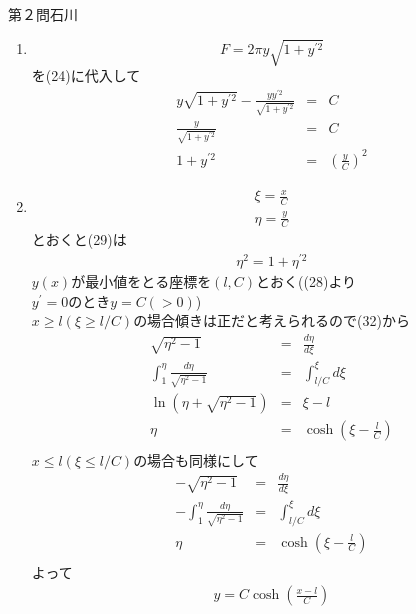 \begin{answer}{第２問}{石川}
\begin{enumerate}
\begin{eqnarray}
  \int_{x_0}^{x_1} 2\pi y\sqrt{1+y^{\prime 2}}dx
  \end{eqnarray}
\item 
  \begin{equation}
  F = 2\pi y\sqrt{1+y^{\prime 2}}
  \end{equation}
  を(24)に代入して\\
  \begin{eqnarray}
  y\sqrt{1+y^{\prime 2}}-\frac{yy^{\prime 2}}{\sqrt{1+y^{\prime 2}}} &=& C\\
  \frac{y}{\sqrt{1+y^{\prime 2}}} &=& C\\
  1+ y^{\prime 2} &=& \left( \frac{y}{C}\right) ^2
  \end{eqnarray}
\item 
  \begin{eqnarray}
  \xi = \frac{x}{C}\\
  \eta = \frac{y}{C}
  \end{eqnarray}
  とおくと(29)は\\
  \begin{eqnarray}
  \eta^2 = 1+\eta^{\prime 2}
  \end{eqnarray}
  $y(x)$が最小値をとる座標を$(l,C)$とおく((28)より$y^{\prime}=0のときy=C(>0)$)\\
  $x \geq l(\xi \geq l/C)$の場合傾きは正だと考えられるので(32)から\\
  \begin{eqnarray}
  \sqrt{\eta^2 - 1} &=& \frac{d\eta}{d\xi}\\
  \int_1^{\eta}\frac{d\eta}{\sqrt{\eta^2-1}}&=&\int_{l/C}^{\xi}d\xi\\
  \ln(\eta+\sqrt{\eta^2-1})&=&\xi - l\\
  \eta &=& \cosh(\xi-\frac{l}{C})\\
  \end{eqnarray}
  $x \leq l(\xi \leq l/C)$の場合も同様にして\\
  \begin{eqnarray}
  -\sqrt{\eta^2 - 1} &=& \frac{d\eta}{d\xi}\\
  -\int_1^{\eta}\frac{d\eta}{\sqrt{\eta^2-1}}&=&\int_{l/C}^{\xi}d\xi\\
  \eta &=& \cosh(\xi-\frac{l}{C})\\
  \end{eqnarray}
  よって\\
  \begin{eqnarray}
  y = C\cosh(\frac{x-l}{C})
  \end{eqnarray}
\end{enumerate}
\end{answer}
